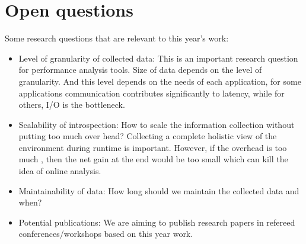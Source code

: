 \section{Open questions}
Some research questions that are relevant to this year's work:

\begin{itemize}
 \item Level of granularity of collected data: This is an important research question for performance analysis tools. Size of data depends on the level of granularity.  And this level depends on the needs of each application, for some applications communication contributes significantly to latency, while for others, I/O is the bottleneck. 
\item Scalability of introspection: How to scale the information collection without putting too much over head? Collecting a complete holistic view of the environment during runtime is important. However, if the overhead is too much , then the net gain at the end would be too small which can kill the idea of online analysis. 
\item Maintainability of data: How long should we maintain the collected data and when?
\item Potential publications: We are aiming to publish research papers in refereed conferences/workshops based on this year work.

\end{itemize}

